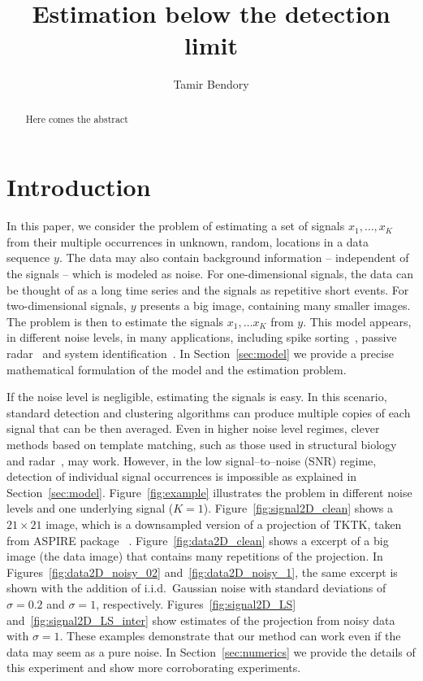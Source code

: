 \documentclass[english,11pt]{article}
\newcommand{\TODO}[1]{{\color{red}{[#1]}}}
\numberwithin{equation}{section}
\theoremstyle{plain}
\theoremstyle{definition}
\theoremstyle{remark}
\theoremstyle{plain}
\theoremstyle{remark}
\theoremstyle{plain}
\theoremstyle{plain}
\newcommand{\SNR}{{\textsf{SNR}}}
\begin{document}
\title{Estimation below the detection limit}


\author{Tamir Bendory}
\maketitle

\begin{abstract}
	Here comes the abstract
\end{abstract}

\section{Introduction}

In this paper, we consider the problem of estimating a set of signals $x_1,\ldots,x_K$ from their multiple occurrences in unknown, random, locations in a data sequence $y$. The data may also contain background information -- independent of the signals -- which is modeled as noise.
For one-dimensional signals, the data can be thought of as a long time series and the signals as repetitive short events. For two-dimensional signals, $y$ presents a big image, containing many smaller images.  
The problem is then to estimate the signals $x_1,\ldots x_K$ from $y$. This
model appears, in different noise levels, in many applications, including spike sorting~\cite{lewicki1998review}, passive radar~\cite{gogineni2017passive} and system identification~\cite{ljung1998system}.
In Section~\ref{sec:model} we provide a precise mathematical formulation of the model and the estimation problem.

If the noise level is negligible, estimating the signals is easy. 
In this scenario, standard detection and clustering algorithms can produce multiple copies of each signal that can be then averaged. 
Even in higher noise level regimes, clever methods based on template matching, such as those used in structural biology~\cite{heimowitz2018apple} and radar~\cite{gogineni2017passive}, may work. \TODO{Do we want to add another 1D example to demonstare the problem, similarly to Figure 1.1 in the bispectrum paper?}
However, in the low signal--to--noise (\SNR) regime, detection of individual signal occurrences is impossible as explained in Section~\ref{sec:model}. Figure~\ref{fig:example} illustrates the problem in different noise levels and one underlying signal ($K=1$). 
Figure~\ref{fig:signal2D_clean} shows a $21\times 21$ image, which is a downsampled version of a projection of TKTK, taken from \textsf{ASPIRE} package~\cite{aspire} \TODO{The image is taken from the example folder}. 
Figure~\ref{fig:data2D_clean} shows a excerpt of a big image (the data image) that contains many repetitions of the projection. In Figures~\ref{fig:data2D_noisy_02} and~\ref{fig:data2D_noisy_1}, the same excerpt is shown with the addition of i.i.d.\ Gaussian noise with standard deviations of $\sigma=0.2$ and $\sigma=1$, respectively.  Figures~\ref{fig:signal2D_LS} and~\ref{fig:signal2D_LS_inter} show estimates of the projection from noisy data with $\sigma=1$. These examples demonstrate that our method can work even if the data may seem as a pure noise. In Section~\ref{sec:numerics} we provide the details of this experiment and show more corroborating experiments. 
\end{document}
